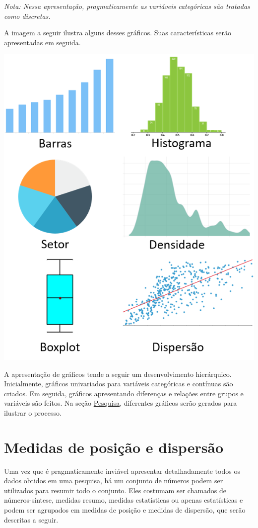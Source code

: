 \documentclass[
]{book}
\begin{document}
\emph{Nota: Nessa apresentação, pragmaticamente as variáveis categóricas são tratadas como discretas.}

A imagem a seguir ilustra alguns desses gráficos. Suas características serão apresentadas em seguida.

\includegraphics{./img/cap_graficos.png}

A apresentação de gráficos tende a seguir um desenvolvimento hierárquico. Inicialmente, gráficos univariados para variáveis categóricas e contínuas são criados. Em seguida, gráficos apresentando diferenças e relações entre grupos e variáveis são feitos. Na seção \protect\hyperlink{pesquisa}{Pesquisa}, diferentes gráficos serão gerados para ilustrar o processo.

\hypertarget{medidas-de-posiuxe7uxe3o-e-dispersuxe3o}{%
\section{Medidas de posição e dispersão}\label{medidas-de-posiuxe7uxe3o-e-dispersuxe3o}}

Uma vez que é pragmaticamente inviável apresentar detalhadamente todos os dados obtidos em uma pesquisa, há um conjunto de números podem ser utilizados para resumir todo o conjunto. Eles costumam ser chamados de números-síntese, medidas resumo, medidas estatísticas ou apenas estatísticas e podem ser agrupados em medidas de posição e medidas de dispersão, que serão descritas a seguir.
\end{document}
